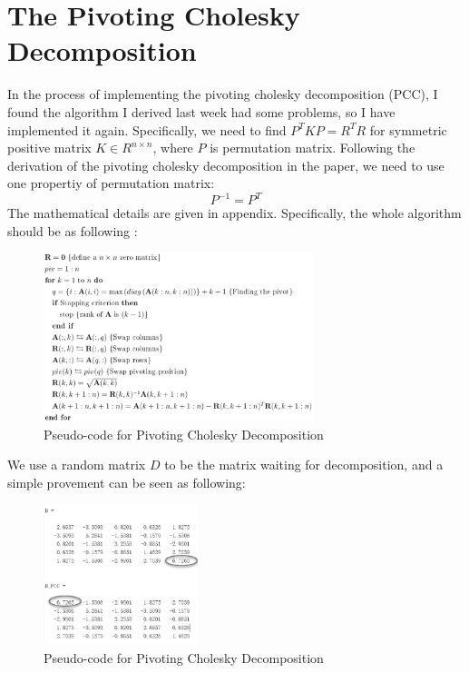 \documentclass{article} %
\newcounter{math}
\begin{document}
\section{The Pivoting Cholesky Decomposition}
In the process of implementing the pivoting cholesky decomposition (PCC), I found the algorithm I derived last week had some problems, so I have implemented it again. Specifically, we need to find $P^TKP=R^TR$ for symmetric positive matrix $K\in R^{n\times n}$, where $P$ is permutation matrix. Following the derivation of the pivoting cholesky decomposition in the paper, we need to use one propertiy of permutation matrix:
\begin{equation}
P^{-1}=P^{T}
\end{equation}
The mathematical details are given in appendix. Specifically, the whole algorithm should be as following \cite{1}:
 \begin{figure}[h]
	\begin{center}
		\includegraphics[width=0.7\textwidth]{PCC}
	\end{center}
	\caption{Pseudo-code for Pivoting Cholesky Decomposition}
	\label{fig1}
\end{figure}
We use a random matrix $D$ to be the matrix waiting for decomposition, and a simple provement can be seen as following:
 \begin{figure}[h]
	\begin{center}
		\includegraphics[width=0.4\textwidth]{test1}
	\end{center}
	\caption{Pseudo-code for Pivoting Cholesky Decomposition}
	\label{fig2}
\end{figure}
\end{document}
